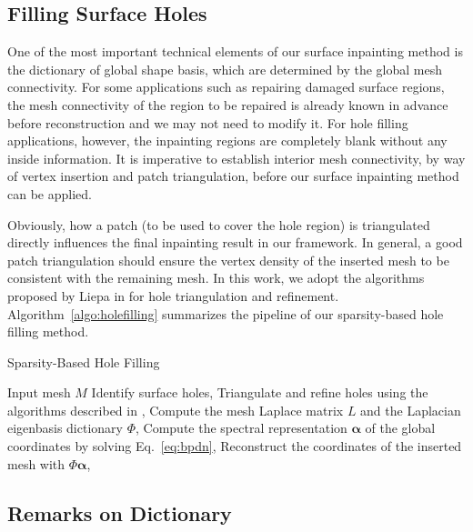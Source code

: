 \subsection{Filling Surface Holes}
\label{sec:inpaint:holefilling}

One of the most important technical elements of our surface inpainting
method is the dictionary of global shape basis, which are determined by
the global mesh connectivity. For some applications such as repairing
damaged surface regions, the mesh connectivity of the region to be
repaired is already known in advance before reconstruction and we may
not need to modify it. For hole filling applications, however, the
inpainting regions are completely blank without any inside
information. It is imperative to establish interior mesh connectivity,
by way of vertex insertion and patch triangulation, before our surface
inpainting method can be applied.

Obviously, how a patch (to be used to cover the hole region) is
triangulated directly influences the final inpainting result in our
framework. In general, a good patch triangulation should ensure the
vertex density of the inserted mesh to be consistent with the
remaining mesh. In this work, we adopt the algorithms proposed by
Liepa in \cite{Liepa2003} for hole triangulation and refinement.
Algorithm~\ref{algo:holefilling} summarizes the pipeline of our
sparsity-based hole filling method.

\begin{algorithm}
\caption{Sparsity-Based Hole Filling}
\label{algo:holefilling}
\begin{algorithmic}[1]
  \REQUIRE Input mesh $M$
\STATE Identify surface holes,
\STATE Triangulate and refine holes using the algorithms described in
  \cite{Liepa2003},
\STATE Compute the mesh Laplace matrix $L$ and the Laplacian eigenbasis dictionary $\Phi$,
\STATE Compute the spectral representation $\mathbf{\alpha}$ of the global coordinates by solving Eq.~\ref{eq:bpdn},
\STATE Reconstruct the coordinates of the inserted mesh with $\Phi\mathbf{\alpha}$,
\ENDFOR
\end{algorithmic}
\end{algorithm}

\subsection{Remarks on Dictionary}
\label{sec:inpaint:remark}

